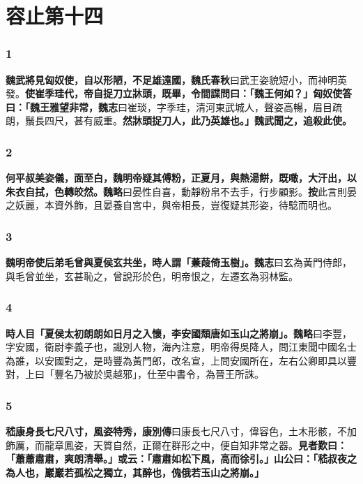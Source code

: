 \chapter{容止第十四}

\subsection*{1}

\textbf{魏武將見匈奴使，自以形陋，不足雄遠國，}{\footnotesize \textbf{魏氏春秋}曰武王姿貌短小，而神明英發。}\textbf{使崔季珪代，帝自捉刀立牀頭，既畢，令間諜問曰：「魏王何如？」匈奴使答曰：「魏王雅望非常，}{\footnotesize \textbf{魏志}曰崔琰，字季珪，清河東武城人，聲姿高暢，眉目疏朗，鬚長四尺，甚有威重。}\textbf{然牀頭捉刀人，此乃英雄也。」魏武聞之，追殺此使。}

\subsection*{2}

\textbf{何平叔美姿儀，面至白，魏明帝疑其傅粉，正夏月，與熱湯餅，既噉，大汗出，以朱衣自拭，色轉皎然。}{\footnotesize \textbf{魏略}曰晏性自喜，動靜粉帛不去手，行步顧影。\textbf{按}此言則晏之妖麗，本資外飾，且晏養自宮中，與帝相長，豈復疑其形姿，待騐而明也。}

\subsection*{3}

\textbf{魏明帝使后弟毛曾與夏侯玄共坐，時人謂「蒹葭倚玉樹」。}{\footnotesize \textbf{魏志}曰玄為黃門侍郎，與毛曾並坐，玄甚恥之，曾說形於色，明帝恨之，左遷玄為羽林監。}

\subsection*{4}

\textbf{時人目「夏侯太初朗朗如日月之入懷，李安國頹唐如玉山之將崩」。}{\footnotesize \textbf{魏略}曰李豐，字安國，衛尉李義子也，識別人物，海內注意，明帝得吳降人，問江東聞中國名士為誰，以安國對之，是時豐為黃門郎，改名宣，上問安國所在，左右公卿即具以豐對，上曰「豐名乃被於吳越邪」，仕至中書令，為晉王所誅。}

\subsection*{5}

\textbf{嵇康身長七尺八寸，風姿特秀，}{\footnotesize \textbf{康別傳}曰康長七尺八寸，偉容色，土木形骸，不加飾厲，而龍章鳳姿，天質自然，正爾在群形之中，便自知非常之器。}\textbf{見者歎曰：「蕭蕭肅肅，爽朗清舉。」或云：「肅肅如松下風，高而徐引。」山公曰：「嵇叔夜之為人也，巖巖若孤松之獨立，其醉也，傀俄若玉山之將崩。」}

